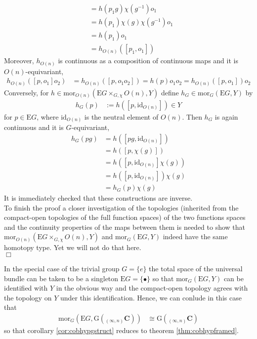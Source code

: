 \begin{prf}[Sketch]
\begin{align*}
  &=
  h(p_{1}g)
  \chi(g^{-1})
  o_{1}
  \\
  &=
  h(p_{1})
  \chi(g)
  \chi(g^{-1})
  o_{1}
  \\
  &=
  h(p_{1})
  o_{1}
  \\
  &=
  h_{O(n)}([p_{1},o_{1}])
\end{align*}
Moreover, $h_{O(n)}$ is continuous as a composition of continuous maps and it is $O(n)$-equivariant,
\begin{align*}
  h_{O(n)}([p,o_{1}]o_{2})
  &=
  h_{O(n)}([p,o_{1}o_{2}])
  =
  h(p)
  o_{1}
  o_{2}
  =
  h_{O(n)}([p,o_{1}])
  o_{2}
\end{align*}
Conversely, for $h \in \mathrm{mor}_{O(n)}(\mathrm{E}G \times_{G,\chi} O(n),Y)$ define $h_{G} \in \mathrm{mor}_{G}(\mathrm{E}G,Y)$ by
\begin{align*}
  h_{G}(p)
  &:=
  h([p,\mathrm{id}_{O(n)}])
  \in
  Y
\end{align*}
for $p \in \mathrm{E}G$, where $\mathrm{id}_{O(n)}$ is the neutral element of $O(n)$. Then $h_{G}$ is again continuous and it is $G$-equivariant,
\begin{align*}
  h_{G}(pg)
  &=
  h([pg,\mathrm{id}_{O(n)}])
  \\
  &=
  h([p,\chi(g)])
  \\
  &=
  h([p,\mathrm{id}_{O(n)}]\chi(g))
  \\
  &=
  h([p,\mathrm{id}_{O(n)}])
  \chi(g)
  \\
  &=
  h_{G}(p)
  \chi(g)
\end{align*}
It is immediately checked that these constructions are inverse.
\\
To finish the proof a closer investigation of the topologies (inherited from the compact-open topologies of the full function spaces) of the two functions spaces and the continuity properties of the maps between them is needed to show that $\mathrm{mor}_{O(n)}(\mathrm{E}G \times_{G,\chi} O(n),Y)$ and $\mathrm{mor}_{G}(\mathrm{E}G,Y)$ indeed have the same homotopy type. Yet we will not do that here.
\\
\phantom{proven}
\hfill
$\Box$
\end{prf}
In the special case of the trivial group $G = \lbrace e \rbrace$ the total space of the universal bundle can be taken to be a singleton $\mathrm{E}G = \lbrace \bullet \rbrace$ so that $\mathrm{mor}_{G}(\mathrm{E}G,Y)$ can be identified with $Y$ in the obvious way and the compact-open topology agrees with the topology on $Y$ under this identification. Hence, we can conlude in this case that 
\begin{align*}
  \mathrm{mor}_{G}
  \left(
    \mathrm{E}G
    ,
    \mathrm{G}({_{(\infty,n)}}\mathbf{C})
  \right)
  &\cong
  \mathrm{G}({_{(\infty,n)}}\mathbf{C})
\end{align*}
so that corollary \ref{cor:cobhypgstruct} reduces to theorem \ref{thm:cobhypframed}.
